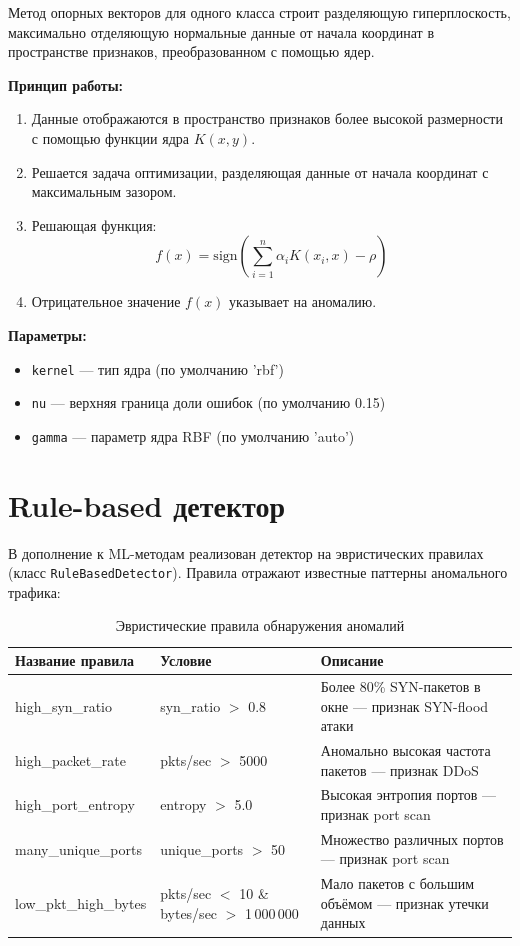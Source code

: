 Метод опорных векторов для одного класса строит разделяющую гиперплоскость, максимально отделяющую нормальные данные от начала координат в пространстве признаков, преобразованном с помощью ядер.

\textbf{Принцип работы:}
\begin{enumerate}
    \item Данные отображаются в пространство признаков более высокой размерности с помощью функции ядра \(K(x, y)\).
    \item Решается задача оптимизации, разделяющая данные от начала координат с максимальным зазором.
    \item Решающая функция:
    \[
    f(x) = \text{sign}\left(\sum_{i=1}^n \alpha_i K(x_i, x) - \rho\right)
    \]
    \item Отрицательное значение \(f(x)\) указывает на аномалию.
\end{enumerate}

\textbf{Параметры:}
\begin{itemize}
    \item \texttt{kernel} — тип ядра (по умолчанию 'rbf')
    \item \texttt{nu} — верхняя граница доли ошибок (по умолчанию 0.15)
    \item \texttt{gamma} — параметр ядра RBF (по умолчанию 'auto')
\end{itemize}

\section{Rule-based детектор}

В дополнение к ML-методам реализован детектор на эвристических правилах (класс \texttt{RuleBasedDetector}). Правила отражают известные паттерны аномального трафика:

\begin{table}[H]
\centering
\caption{Эвристические правила обнаружения аномалий}
\label{tab:rules}
\begin{tabular}{p{3.5cm}p{4cm}p{7cm}}
\toprule
\textbf{Название правила} & \textbf{Условие} & \textbf{Описание} \\
\midrule
high\_syn\_ratio & syn\_ratio $>$ 0.8 & Более 80\% SYN-пакетов в окне — признак SYN-flood атаки \\
\addlinespace
high\_packet\_rate & pkts/sec $>$ 5000 & Аномально высокая частота пакетов — признак DDoS \\
\addlinespace
high\_port\_entropy & entropy $>$ 5.0 & Высокая энтропия портов — признак port scan \\
\addlinespace
many\_unique\_ports & unique\_ports $>$ 50 & Множество различных портов — признак port scan \\
\addlinespace
low\_pkt\_high\_bytes & pkts/sec $<$ 10 \& bytes/sec $>$ 1\,000\,000 & Мало пакетов с большим объёмом — признак утечки данных \\
\bottomrule
\end{tabular}
\end{table}

